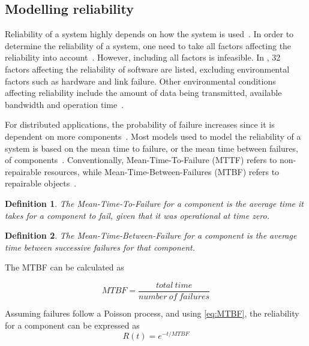 \documentclass{cslthse-msc}
\newtheorem{definition}{Definition}[chapter]
\begin{document}
\subsection{Modelling reliability} \label{subsec:background_modelling_rel}
Reliability of a system highly depends on how the system is used~\cite{surveyRelPrediction}. In order to determine the reliability of a system, one need to take all factors affecting the reliability into account~\cite{surveyReliabilityDistr}. However, including all factors is infeasible. In \cite{factorsAffectingRel}, 32 factors affecting the reliability of software are listed, excluding environmental factors such as hardware and link failure. Other environmental conditions affecting reliability include the amount of data being transmitted, available bandwidth and operation time~\cite{cloudServiceRel, hierarchicalRelModeling}.

For distributed applications, the probability of failure increases since it is dependent on more components~\cite{relModelDistSimSystem}. Most models used to model the reliability of a system is based on the mean time to failure, or the mean time between failures, of components~\cite{relModelAnalysis}. Conventionally, Mean-Time-To-Failure (MTTF) refers to non-repairable resources, while Mean-Time-Between-Failures (MTBF) refers to repairable objects~\cite{effTaskReplMobGrid}.

\begin{definition} \label{def:mttf}
The Mean-Time-To-Failure for a component is the average time it takes for a component to fail, given that it was operational at time zero.
\end{definition}

\begin{definition} \label{def:MTBF}
The Mean-Time-Between-Failure for a component is the average time between successive failures for that component.
\end{definition}

The MTBF can be calculated as

\begin{equation} \label{eq:MTBF}
MTBF = \frac{total\ time}{number\ of\ failures}
\end{equation}

Assuming failures follow a Poisson process, and using \cref{eq:MTBF}, the reliability for a component can be expressed as 
\begin{equation} \label{eq:resource_reliability}
R(t) = e^{-t/MTBF}
\end{equation}
\end{document}
